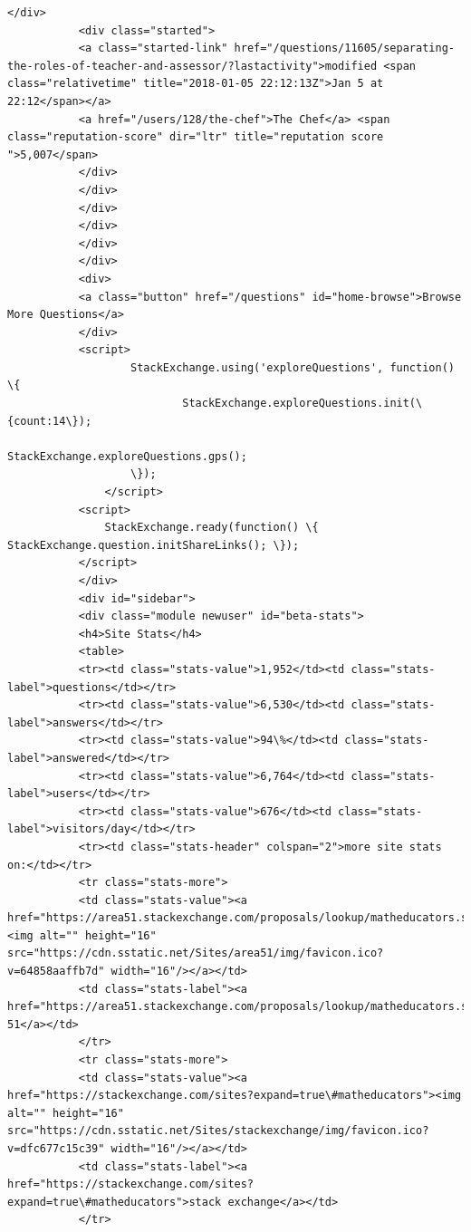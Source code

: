 \documentclass[11pt]{article}
\begin{document}
\begin{Verbatim}[commandchars=\\\{\}]
           </div>
           <div class="started">
           <a class="started-link" href="/questions/11605/separating-the-roles-of-teacher-and-assessor/?lastactivity">modified <span class="relativetime" title="2018-01-05 22:12:13Z">Jan 5 at 22:12</span></a>
           <a href="/users/128/the-chef">The Chef</a> <span class="reputation-score" dir="ltr" title="reputation score ">5,007</span>
           </div>
           </div>
           </div>
           </div>
           </div>
           </div>
           <div>
           <a class="button" href="/questions" id="home-browse">Browse More Questions</a>
           </div>
           <script>
                   StackExchange.using('exploreQuestions', function() \{
                           StackExchange.exploreQuestions.init(\{count:14\});
                                       StackExchange.exploreQuestions.gps();
                   \});
               </script>
           <script>
               StackExchange.ready(function() \{ StackExchange.question.initShareLinks(); \});
           </script>
           </div>
           <div id="sidebar">
           <div class="module newuser" id="beta-stats">
           <h4>Site Stats</h4>
           <table>
           <tr><td class="stats-value">1,952</td><td class="stats-label">questions</td></tr>
           <tr><td class="stats-value">6,530</td><td class="stats-label">answers</td></tr>
           <tr><td class="stats-value">94\%</td><td class="stats-label">answered</td></tr>
           <tr><td class="stats-value">6,764</td><td class="stats-label">users</td></tr>
           <tr><td class="stats-value">676</td><td class="stats-label">visitors/day</td></tr>
           <tr><td class="stats-header" colspan="2">more site stats on:</td></tr>
           <tr class="stats-more">
           <td class="stats-value"><a href="https://area51.stackexchange.com/proposals/lookup/matheducators.stackexchange.com"><img alt="" height="16" src="https://cdn.sstatic.net/Sites/area51/img/favicon.ico?v=64858aaffb7d" width="16"/></a></td>
           <td class="stats-label"><a href="https://area51.stackexchange.com/proposals/lookup/matheducators.stackexchange.com">area 51</a></td>
           </tr>
           <tr class="stats-more">
           <td class="stats-value"><a href="https://stackexchange.com/sites?expand=true\#matheducators"><img alt="" height="16" src="https://cdn.sstatic.net/Sites/stackexchange/img/favicon.ico?v=dfc677c15c39" width="16"/></a></td>
           <td class="stats-label"><a href="https://stackexchange.com/sites?expand=true\#matheducators">stack exchange</a></td>
           </tr>

\end{Verbatim}
\end{document}
